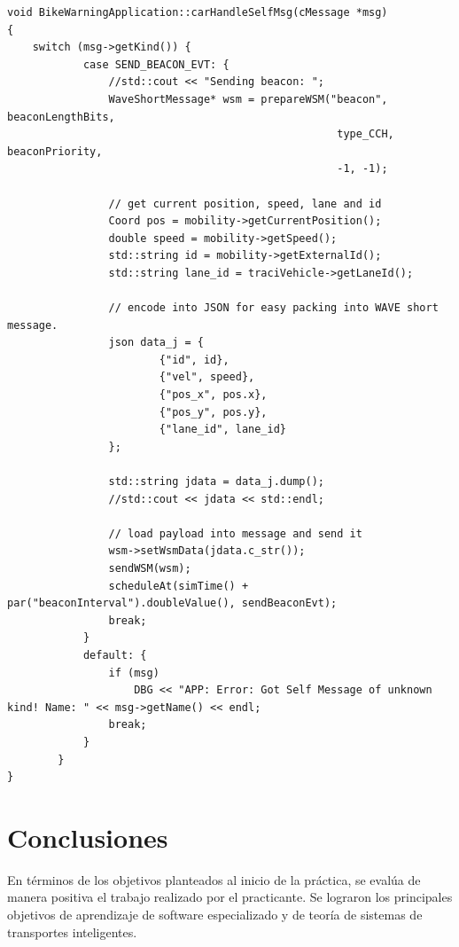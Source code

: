 \documentclass[11pt,letterpaper]{article}
\begin{document}
\noindent\begin{minipage}{\linewidth}
\begin{lstlisting}[style=CPP, caption={Código encargado de la medición periódica y envío de datos a la RSU en \emph{BikeWarningApplication}.}, label={lst:send_json}]
void BikeWarningApplication::carHandleSelfMsg(cMessage *msg)
{
    switch (msg->getKind()) {
            case SEND_BEACON_EVT: {
                //std::cout << "Sending beacon: ";
                WaveShortMessage* wsm = prepareWSM("beacon", beaconLengthBits,
													type_CCH, beaconPriority,
													-1, -1);

				// get current position, speed, lane and id
                Coord pos = mobility->getCurrentPosition();
                double speed = mobility->getSpeed();
                std::string id = mobility->getExternalId();
                std::string lane_id = traciVehicle->getLaneId();

				// encode into JSON for easy packing into WAVE short message.
                json data_j = {
                        {"id", id},
                        {"vel", speed},
                        {"pos_x", pos.x},
                        {"pos_y", pos.y},
                        {"lane_id", lane_id}
                };

                std::string jdata = data_j.dump();
                //std::cout << jdata << std::endl;

				// load payload into message and send it
                wsm->setWsmData(jdata.c_str());
                sendWSM(wsm);
                scheduleAt(simTime() + par("beaconInterval").doubleValue(), sendBeaconEvt);
                break;
            }
            default: {
                if (msg)
                    DBG << "APP: Error: Got Self Message of unknown kind! Name: " << msg->getName() << endl;
                break;
            }
        }
}
\end{lstlisting}
\end{minipage}


\newpage
\section{Conclusiones}

En términos de los objetivos planteados al inicio de la práctica, se evalúa de manera positiva el trabajo realizado por el practicante. Se lograron los principales objetivos de aprendizaje de software especializado y de teoría de sistemas de transportes inteligentes.
\end{document}
